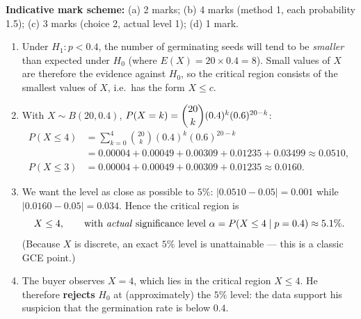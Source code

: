 \documentclass[11pt]{article}
\begin{document}
\begin{corrige}
\textbf{Indicative mark scheme:} (a) 2 marks; (b) 4 marks (method 1, each probability 1.5); (c) 3 marks (choice 2, actual level 1); (d) 1 mark.
\begin{enumerate}
\item Under $H_1: p < 0.4$, the number of germinating seeds will tend to be \emph{smaller} than expected under $H_0$ (where $E(X) = 20 \times 0.4 = 8$). Small values of $X$ are therefore the evidence against $H_0$, so the critical region consists of the smallest values of $X$, i.e.\ has the form $X \leq c$.
\item With $X \sim B(20, 0.4)$, $P(X = k) = \dbinom{20}{k}(0.4)^k(0.6)^{20-k}$:
\begin{align*}
P(X \leq 4) &= \sum_{k=0}^{4}\binom{20}{k}(0.4)^k(0.6)^{20-k} \\
&= 0.00004 + 0.00049 + 0.00309 + 0.01235 + 0.03499 \approx 0.0510, \\
P(X \leq 3) &= 0.00004 + 0.00049 + 0.00309 + 0.01235 \approx 0.0160.
\end{align*}
\item We want the level as close as possible to $5\%$: $|0.0510 - 0.05| = 0.001$ while $|0.0160 - 0.05| = 0.034$. Hence the critical region is
\[ X \leq 4, \qquad \text{with \emph{actual} significance level } \alpha = P(X \leq 4 \mid p = 0.4) \approx 5.1\%. \]
(Because $X$ is discrete, an exact $5\%$ level is unattainable — this is a classic GCE point.)
\item The buyer observes $X = 4$, which lies in the critical region $X \leq 4$. He therefore \textbf{rejects} $H_0$ at (approximately) the $5\%$ level: the data support his suspicion that the germination rate is below $0.4$.
\end{enumerate}
\end{corrige}
\end{document}
